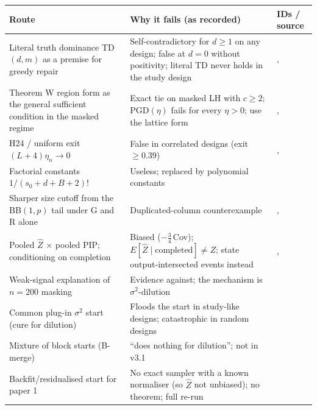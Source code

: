 {\small
\begin{xltabular}{\textwidth}{@{}>{\raggedright\arraybackslash}p{4.2cm}>{\raggedright\arraybackslash}X >{\raggedright\arraybackslash}p{3.3cm}@{}}
\toprule
\textbf{Route} & \textbf{Why it fails (as recorded)} & \textbf{IDs / source} \\
\midrule
\endhead
Literal truth dominance TD$(d,m)$ as a premise for greedy repair & Self-contradictory for $d\ge1$ on any design; false at $d=0$ without positivity; literal TD never holds in the study design & ,   \\
Theorem W region form as the general sufficient condition in the masked regime & Exact tie on masked LH with $c\ge2$; PGD$(\eta)$ fails for every $\eta>0$; use the lattice form & ,   \\
H24 / uniform exit $(L+4)\eta_n\to0$ & False in correlated designs (exit $\ge0.39$) & ,   \\
Factorial constants $1/(s_0+d+B+2)!$ & Useless; replaced by polynomial constants &   \\
Sharper size cutoff from the BB$(1,p)$ tail under G and R alone & Duplicated-column counterexample & ,   \\
Pooled $\hat Z$ × pooled PIP; conditioning on completion & Biased ($-\tfrac34\,$Cov); $E[\hat Z\mid\text{completed}]\neq Z$; state output-intersected events instead & ,   \\
Weak-signal explanation of $n=200$ masking & Evidence against; the mechanism is $\sigma^2$-dilution &   \\
Common plug-in $\sigma^2$ start (cure for dilution) & Floods the start in study-like designs; catastrophic in random designs &   \\
Mixture of block starts (B-merge) & ``does nothing for dilution''; not in v3.1 &   \\
Backfit/residualised start for paper 1 & No exact sampler with a known normaliser (so $\hat Z$ not unbiased); no theorem; full re-run &   \\

\end{xltabular}}
